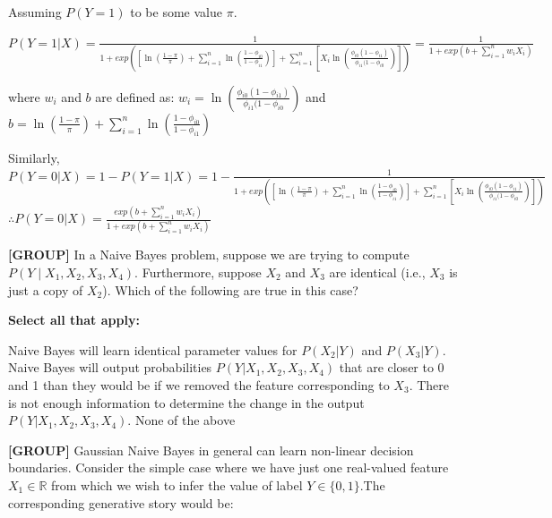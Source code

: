\documentclass[11pt,addpoints,answers]{exam}
\newcommand{\group}{\textbf{[GROUP]} }
\begin{document}
\begin{questions}
\begin{enumerate}
\begin{tcolorbox}[fit,height=10cm, blank, borderline={1pt}{-2pt},nobeforeafter]
Assuming $P(Y = 1)$ to be some value $\pi$.

$P(Y=1|X) = \frac{1}{1 + exp \left(\left[\ln(\frac{1 - \pi}{\pi}) + \sum \limits_{i=1}^n \ln(\frac{1 - \phi_{i0}}{1 - \phi_{i1}}) \right]+  \sum \limits_{i=1}^n\left[X_i \ln(\frac{\phi_{i0} (1 - \phi_{i1})}{\phi_{i1} (1 - \phi_{i0}})\right]\right)} = \frac{1}{1 + exp \left(b +  \sum \limits_{i=1}^nw_iX_i\right)}$\newline

where $w_i$ and $b$ are defined as: $w_i = \ln(\frac{\phi_{i0} (1 - \phi_{i1})}{\phi_{i1} (1 - \phi_{i0}})$ and $b = \ln(\frac{1 - \pi}{\pi}) + \sum \limits_{i=1}^n \ln(\frac{1 - \phi_{i0}}{1 - \phi_{i1}})$

Similarly, \newline
$P(Y = 0| X) =  1 - P(Y=1|X) = 1 - \frac{1}{1 + exp \left(\left[\ln(\frac{1 - \pi}{\pi}) + \sum \limits_{i=1}^n \ln(\frac{1 - \phi_{i0}}{1 - \phi_{i1}}) \right]+  \sum \limits_{i=1}^n\left[X_i \ln(\frac{\phi_{i0} (1 - \phi_{i1})}{\phi_{i1} (1 - \phi_{i0}})\right]\right)}$
$\therefore P(Y = 0| X) =  \frac{exp \left(b +  \sum \limits_{i=1}^n w_iX_i\right)}{1 + exp \left(b +  \sum \limits_{i=1}^n w_iX_i\right)}$\newline
    \end{tcolorbox}
        
\end{enumerate}

    
    \question[3] \group In a Naive Bayes problem, suppose we are trying to compute $P(Y\mid X_1,X_2,X_3,X_4)$.  Furthermore, suppose  $X_2$  and  $X_3$  are identical (i.e., $X_3$  is just a copy of $X_2$).  Which of the following are true in this case?

    \textbf{Select all that apply:}
    {\checkboxchar{$\Box$} \checkedchar{$\blacksquare$}
    \begin{checkboxes}
        \CorrectChoice Naive Bayes will learn identical parameter values for $P(X_2|Y)$ and $P(X_3|Y)$.
        \CorrectChoice Naive Bayes will output probabilities $P(Y|X_1,X_2,X_3,X_4)$ that are closer to 0 and 1 than they would be if we removed the feature corresponding to $X_3$.
        \choice There is not enough information to determine the change in the output $P(Y|X_1,X_2,X_3,X_4)$.
        \choice None of the above
    \end{checkboxes}
    }
    
    
    
    \question[4] \group Gaussian Naive Bayes in general can learn non-linear decision boundaries. Consider the simple case where we have just one real-valued feature $X_1\in\mathbb{R}$ from which we wish to infer the value of label $Y\in\{0,1\}$.The corresponding generative story would be:
    

\end{questions}
\end{document}
